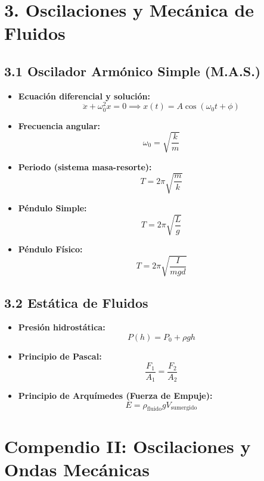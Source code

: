 \documentclass[11pt,a4paper]{article}
\begin{document}
\section*{3. Oscilaciones y Mecánica de Fluidos}

\subsection*{3.1 Oscilador Armónico Simple (M.A.S.)}

\begin{itemize}
  \item \textbf{Ecuación diferencial y solución:}
  \[
    \ddot{x} + \omega_0^2 x = 0 \implies x(t) = A \cos(\omega_0 t + \phi)
  \]
  \item \textbf{Frecuencia angular:}
  \[
    \omega_0 = \sqrt{\frac{k}{m}}
  \]
  \item \textbf{Periodo (sistema masa-resorte):}
  \[
    T = 2\pi\sqrt{\frac{m}{k}}
  \]
  \item \textbf{Péndulo Simple:}
  \[
    T = 2\pi\sqrt{\frac{L}{g}}
  \]
  \item \textbf{Péndulo Físico:}
  \[
    T = 2\pi\sqrt{\frac{I}{m g d}}
  \]
\end{itemize}

\subsection*{3.2 Estática de Fluidos}

\begin{itemize}
  \item \textbf{Presión hidrostática:}
  \[
    P(h) = P_0 + \rho g h
  \]
  \item \textbf{Principio de Pascal:}
  \[
    \frac{F_1}{A_1} = \frac{F_2}{A_2}
  \]
  \item \textbf{Principio de Arquímedes (Fuerza de Empuje):}
  \[
    E = \rho_{\text{fluido}} g V_{\text{sumergido}}
  \]
\end{itemize}

\section*{Compendio II: Oscilaciones y Ondas Mecánicas}
\end{document}
